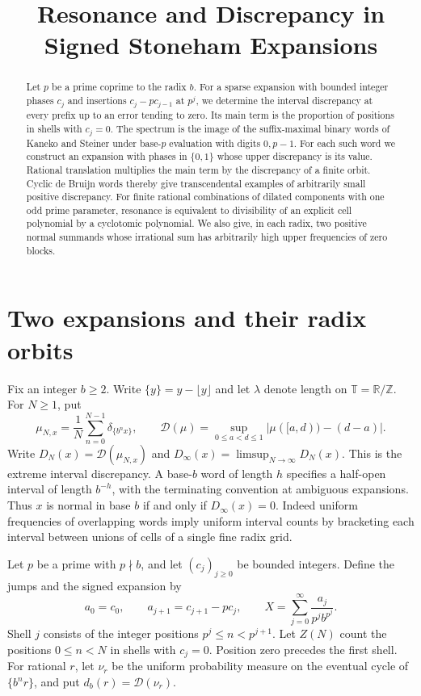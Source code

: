 \documentclass[11pt]{article}
\title{Resonance and Discrepancy in Signed Stoneham Expansions}
\author{}
\date{}
\newcommand{\Z}{\mathbb Z}
\newcommand{\R}{\mathbb R}
\newcommand{\Disc}{\mathcal D}
\newcommand{\fr}[1]{\{#1\}}
\newcommand{\orb}{\mathbb T}
\begin{document}
\maketitle
\begin{abstract}
Let \(p\) be a prime coprime to the radix \(b\). For a sparse expansion with bounded integer phases \(c_j\) and insertions \(c_j-pc_{j-1}\) at \(p^j\), we determine the interval discrepancy at every prefix up to an error tending to zero. Its main term is the proportion of positions in shells with \(c_j=0\). The spectrum is the image of the suffix-maximal binary words of Kaneko and Steiner under base-\(p\) evaluation with digits \(0,p-1\). For each such word we construct an expansion with phases in \(\{0,1\}\) whose upper discrepancy is its value. Rational translation multiplies the main term by the discrepancy of a finite orbit. Cyclic de Bruijn words thereby give transcendental examples of arbitrarily small positive discrepancy. For finite rational combinations of dilated components with one odd prime parameter, resonance is equivalent to divisibility of an explicit cell polynomial by a cyclotomic polynomial. We also give, in each radix, two positive normal summands whose irrational sum has arbitrarily high upper frequencies of zero blocks.
\end{abstract}

\section{Two expansions and their radix orbits}
Fix an integer \(b\ge2\). Write \(\fr y=y-\lfloor y\rfloor\) and let \(\lambda\) denote length on \(\orb=\R/\Z\). For \(N\ge1\), put
\[
 \mu_{N,x}=\frac1N\sum_{n=0}^{N-1}\delta_{\fr{b^n x}},\qquad
 \Disc(\mu)=\sup_{0\le a<d\le1}|\mu([a,d))-(d-a)| .
\]
Write \(D_N(x)=\Disc(\mu_{N,x})\) and \(D_\infty(x)=\limsup_{N\to\infty}D_N(x)\). This is the extreme interval discrepancy. A base-\(b\) word of length \(h\) specifies a half-open interval of length \(b^{-h}\), with the terminating convention at ambiguous expansions. Thus \(x\) is normal in base \(b\) if and only if \(D_\infty(x)=0\). Indeed uniform frequencies of overlapping words imply uniform interval counts by bracketing each interval between unions of cells of a single fine radix grid.

Let \(p\) be a prime with \(p\nmid b\), and let \((c_j)_{j\ge0}\) be bounded integers. Define the jumps and the signed expansion by
\begin{equation}\label{eq:X}
 a_0=c_0,\qquad a_{j+1}=c_{j+1}-pc_j,\qquad
 X=\sum_{j=0}^{\infty}\frac{a_j}{p^j b^{p^j}} .
\end{equation}
Shell \(j\) consists of the integer positions \(p^j\le n<p^{j+1}\). Let \(Z(N)\) count the positions \(0\le n<N\) in shells with \(c_j=0\). Position zero precedes the first shell. For rational \(r\), let \(\nu_r\) be the uniform probability measure on the eventual cycle of \(\fr{b^n r}\), and put \(d_b(r)=\Disc(\nu_r)\).
\end{document}
